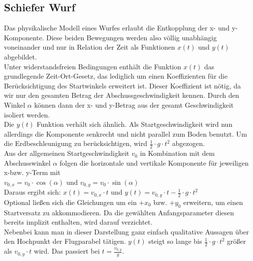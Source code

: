 \subsection{Schiefer Wurf}
Das physikalische Modell eines Wurfes erlaubt die Entkopplung der x- und y-Komponente. Diese beiden Bewegungen werden also völlig unabhängig voneinander und nur in Relation der Zeit als Funktionen $x(t)$ und $y(t)$ abgebildet.
\\
Unter widerstandsfreien Bedingungen enthält die Funktion $x(t)$ das grundlegende Zeit-Ort-Gesetz\parencite{WegZeitGesetzWiki}, das lediglich um einen Koeffizienten für die Berücksichtigung des Startwinkels erweitert ist. 
Dieser Koeffizient ist nötig, da wir nur den gesamten Betrag der Abschussgeschwindigkeit kennen. Durch den Winkel $\alpha$ können dann der x- und y-Betrag aus der gesamt Geschwindigkeit isoliert werden. 
\\
Die $y(t)$ Funktion verhält sich ähnlich. Als Startgeschwindigkeit wird nun allerdings die Komponente senkrecht und nicht parallel zum Boden benutzt. Um die Erdbeschleunigung zu berücksichtigen, wird $\frac{1}{2}\cdot g \cdot t^2$ abgezogen.
\\
Aus der allgemeinen Startgeschwindigkeit $v_0$ in Kombination mit dem Abschusswinkel $\alpha$ folgen die horizontale und vertikale Komponente für jeweiligen x-bzw. y-Term mit \\
$v_{0,x} = v_0\cdot\cos(\alpha)$ und
$v_{0,y} = v_0\cdot\sin(\alpha)$
\\Daraus ergibt sich:
$x(t)=v_{0,x}\cdot t$ und
$y(t)=v_{0,y}\cdot t- \frac{1}{2}\cdot g \cdot t^2$
\\
Optional ließen sich die Gleichungen um ein $+x_0$ bzw. $+y_0$ erweitern, um einen Startversatz zu akkommodieren. Da die gewählten Anfangsparameter diesen bereits implizit enthalten, wird darauf verzichtet.
\\
Nebenbei kann man in dieser Darstellung ganz einfach qualitative Aussagen über den Hochpunkt der Flugparabel tätigen. $y(t)$ steigt so lange bis $\frac{1}{2}\cdot g\cdot t^2$ größer als $v_{0,y}\cdot t$ wird. Das passiert bei $t=\frac{v_{0,y}}{g}$.
\\
